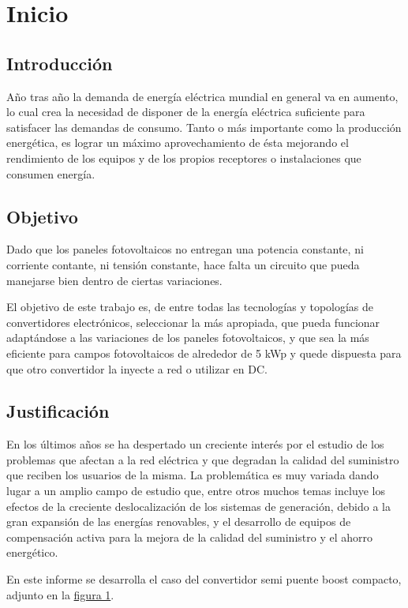 \section{Inicio}

\subsection{Introducción}

Año tras año la demanda de energía eléctrica mundial en general va en aumento, lo cual crea la necesidad de disponer de la energía eléctrica suficiente para satisfacer las demandas de consumo. Tanto o más importante como la producción energética, es lograr un máximo aprovechamiento de ésta mejorando el rendimiento de los equipos y de los propios receptores o instalaciones que consumen energía.

\subsection{Objetivo}

Dado que los paneles fotovoltaicos no entregan una potencia constante, ni corriente contante, ni tensión constante, hace falta un circuito que pueda manejarse bien dentro de ciertas variaciones.

El objetivo de este trabajo es, de entre todas las tecnologías y topologías de convertidores electrónicos, seleccionar la más apropiada, que pueda funcionar adaptándose a las variaciones de los paneles fotovoltaicos, y que sea la más eficiente para campos fotovoltaicos de alrededor de 5 kWp y quede dispuesta para que otro convertidor la inyecte a red o utilizar en DC. 

\subsection{Justificación}

En los últimos años se ha despertado un creciente interés por el estudio de los problemas que afectan a la red eléctrica y que degradan la calidad del suministro que reciben los usuarios de la misma. La problemática es muy variada dando lugar a un amplio campo de estudio que, entre otros muchos temas incluye los efectos de la creciente deslocalización de los sistemas de generación, debido a la gran expansión de las energías renovables, y el desarrollo de equipos de compensación activa para la mejora de la calidad del suministro y el ahorro energético.

En este informe se desarrolla el caso del convertidor semi puente boost compacto, adjunto en la \hyperref[fig:topologiareferencia]{figura 1}.

